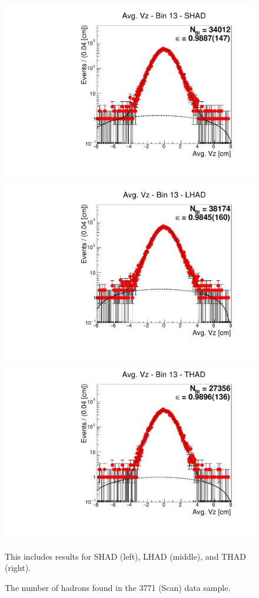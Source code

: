 \begin{figure}[H]
\centering
\includegraphics[scale=0.25]{figures/plots/nonDDbar_fit_results/scan/fit_scan_13_data_SHAD.pdf}
\hspace{-0.5cm}
\includegraphics[scale=0.25]{figures/plots/nonDDbar_fit_results/scan/fit_scan_13_data_LHAD.pdf}
\hspace{-0.5cm}
\includegraphics[scale=0.25]{figures/plots/nonDDbar_fit_results/scan/fit_scan_13_data_THAD.pdf}
\caption{The number of hadrons found in the 3771 (Scan) data sample.}
{This includes results for SHAD (left), LHAD (middle), and THAD (right).}
\label{fig:hadron_fits_scan_13}
\end{figure}

